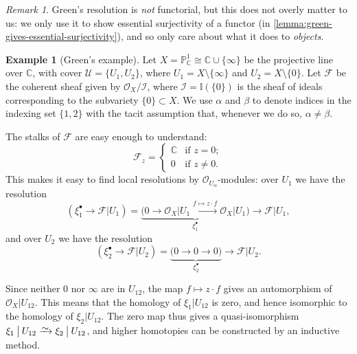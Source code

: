 \documentclass[11pt,fleqn]{article}
\theoremstyle{plain}
\theoremstyle{definition}
\newtheorem{example}[theorem]{Example}
\theoremstyle{remark}
\newtheorem{remark}[theorem]{Remark}
\numberwithin{equation}{theorem}
\newcommand{\cover}{\mathcal{U}}
\newcommand{\OO}{\mathcal{O}}
\newcommand{\restricted}{\mathbin{\big\vert}}
\newcommand{\congto}{\xrightarrow{\raisebox{-.5ex}[0ex][0ex]{$\sim$}}}
\begin{document}
        \begin{remark}
            Green's resolution is \emph{not} functorial, but this does not overly matter to us: we only use it to show essential surjectivity of a functor (in \cref{lemma:green-gives-essential-surjectivity}), and so only care about what it does to \emph{objects}.
        \end{remark}

        \begin{example}[Green's example]\label{example:green's-example}
            Let $X=\mathbb{P}_\mathbb{C}^1\cong\mathbb{C}\cup\{\infty\}$ be the projective line over $\mathbb{C}$, with cover $\cover=\{U_1,U_2\}$, where $U_1=X\setminus\{\infty\}$ and $U_2=X\setminus\{0\}$.
            Let $\mathscr{F}$ be the coherent sheaf given by $\OO_X/\mathscr{I}$, where $\mathscr{I}=\mathbb{I}(\{0\})$ is the sheaf of ideals corresponding to the subvariety $\{0\}\subset X$.
            We use $\alpha$ and $\beta$ to denote indices in the indexing set $\{1,2\}$ with the tacit assumption that, whenever we do so, $\alpha\neq\beta$.

            The stalks of $\mathscr{F}$ are easy enough to understand:
            \[
                \mathscr{F}_z =
                \begin{cases}
                    \mathbb{C} &\mbox{if $z=0$};\\
                    0 &\mbox{if $z\neq0$}.
                \end{cases}
            \]
            This makes it easy to find local resolutions by $\OO_{U_\alpha}$-modules: over $U_1$ we have the resolution
            \begin{equation*}
                (\xi_1^\bullet\to \mathscr{F}\restricted U_1) =  \underbrace{\big(0\to\OO_X\restricted {U_1}\xrightarrow{f\mapsto z\cdot f}\OO_X\restricted {U_1}\big)}_{\xi_1^\bullet}\to \mathscr{F}\restricted {U_1},
            \end{equation*}
            and over $U_2$ we have the resolution
            \begin{equation*}
                (\xi_2^\bullet\to \mathscr{F}\restricted U_2) = \underbrace{\big(0\to0\to0\big)}_{\xi_2^\bullet}\to \mathscr{F}\restricted {U_2}.
            \end{equation*}

            Since neither $0$ nor $\infty$ are in $U_{12}$, the map $f\mapsto z\cdot f$ gives an automorphism of $\OO_X\restricted U_{12}$.
            This means that the homology of $\xi_1\restricted U_{12}$ is zero, and hence isomorphic to the homology of $\xi_2\restricted U_{12}$.
            The zero map thus gives a quasi-isomorphism $\xi_1\restricted U_{12} \congto \xi_2\restricted U_{12}$, and higher homotopies can be constructed by an inductive method.


\end{example}
\end{document}
